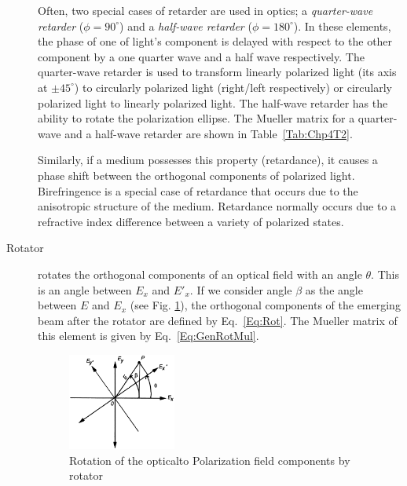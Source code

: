 \begin{description}
\noindent Often, two special cases of retarder are used in optics; a \textit{quarter-wave retarder} ($\phi = 90^{\circ}$) and a \textit{half-wave retarder} ($\phi = 180 ^{\circ}$).
In these elements, the phase of one of light's component is delayed with respect to the other component by a one quarter wave and a half wave respectively.
The quarter-wave retarder is used to transform linearly polarized light (its axis at $\pm45^{\circ}$) to circularly polarized light (right/left respectively) or circularly polarized light to linearly polarized light.
The half-wave retarder has the ability to rotate the polarization ellipse.
The Mueller matrix for a quarter-wave and a half-wave retarder are shown in Table~\ref{Tab:Chp4T2}.


Similarly, if a medium possesses this property (retardance), it causes a phase shift between the orthogonal components of polarized light.
Birefringence is a special case of retardance that occurs due to the anisotropic structure of the medium.
Retardance normally occurs due to a refractive index difference between a variety of polarized states.


\item [Rotator] rotates the orthogonal components of an optical field with an angle $\theta$.
This is an angle between $E_{x}$ and $E'_{x}$.
If we consider angle $\beta$ as the angle between $E$ and $E_{x}$ (see Fig. \ref{fig:rotator}), the orthogonal components of the emerging beam after the rotator are defined by Eq.~\ref{Eq:Rot}.
The Mueller matrix of this element is given by Eq.~\ref{Eq:GenRotMul}. %

\begin{figure}
 \centering
 \includegraphics[width = 0.35\textwidth]{Chapter4/Figures/rotator.eps}
 \caption{Rotation of the opticalto Polarization field components by rotator}
 \label{fig:rotator}
\end{figure}


\end{description}
